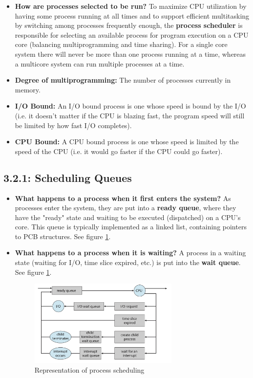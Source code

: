 \documentclass[12pt]{article}
\begin{document}
\begin{itemize}
    \item \textbf{How are processes selected to be run?} To maximize CPU utilization by having some process running at all times and to support efficient multitasking by switching among processes frequently enough, the \textbf{process scheduler} is responsible for selecting an available process for program execution on a CPU core (balancing multiprogramming and time sharing). For a single core system there will never be more than one process running at a time, whereas a multicore system can run multiple processes at a time.
    \item \textbf{Degree of multiprogramming:} The number of processes currently in memory.
    \item \textbf{I/O Bound:} An I/O bound process is one whose speed is bound by the I/O (i.e. it doesn't matter if the CPU is blazing fast, the program speed will still be limited by how fast I/O completes).
    \item \textbf{CPU Bound:} A CPU bound process is one whose speed is limited by the speed of the CPU (i.e. it would go faster if the CPU could go faster).
\end{itemize}

\subsection*{3.2.1: Scheduling Queues}

\begin{itemize}
    \item \textbf{What happens to a process when it first enters the system?} As processes enter the system, they are put into a \textbf{ready queue}, where they have the "ready" state and waiting to be executed (dispatched) on a CPU's core. This queue is typically implemented as a linked list, containing pointers to PCB structures. See figure \ref{fig:queueing-diagram}.
    \item \textbf{What happens to a process when it is waiting?} A process in a waiting state (waiting for I/O, time slice expired, etc.) is put into the \textbf{wait queue}. See figure \ref{fig:queueing-diagram}.
    \begin{figure}[ht]
        \centering
        \includegraphics[width=0.7\textwidth]{figures/queueing-diagram.jpg}
        \caption{Representation of process scheduling}
        \label{fig:queueing-diagram}
    \end{figure}
\end{itemize}
\end{document}
